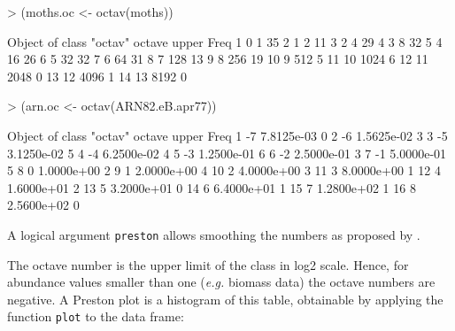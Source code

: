 \documentclass[11pt, A4]{article}
\newcommand{\code}[1]{\texttt{#1}}
\begin{document}
\begin{Schunk}
\begin{Sinput}
> (moths.oc <- octav(moths))
\end{Sinput}
\begin{Soutput}
Object of class "octav"
   octave upper Freq
1       0     1   35
2       1     2   11
3       2     4   29
4       3     8   32
5       4    16   26
6       5    32   32
7       6    64   31
8       7   128   13
9       8   256   19
10      9   512    5
11     10  1024    6
12     11  2048    0
13     12  4096    1
14     13  8192    0
\end{Soutput}
\begin{Sinput}
> (arn.oc <- octav(ARN82.eB.apr77))
\end{Sinput}
\begin{Soutput}
Object of class "octav"
   octave      upper Freq
1      -7 7.8125e-03    0
2      -6 1.5625e-02    3
3      -5 3.1250e-02    5
4      -4 6.2500e-02    4
5      -3 1.2500e-01    6
6      -2 2.5000e-01    3
7      -1 5.0000e-01    5
8       0 1.0000e+00    2
9       1 2.0000e+00    4
10      2 4.0000e+00    3
11      3 8.0000e+00    1
12      4 1.6000e+01    2
13      5 3.2000e+01    0
14      6 6.4000e+01    1
15      7 1.2800e+02    1
16      8 2.5600e+02    0
\end{Soutput}
\end{Schunk}

A logical argument \code{preston} allows smoothing the numbers as proposed by \citet{Preston1948}. 

The octave number is the upper limit of the class in log2 scale. 
Hence, for abundance values smaller than one (\emph{e.g.} biomass data) the octave numbers are negative.
A Preston plot is a histogram of this table, obtainable by applying the function \code{plot} to the data frame:

\end{document}
